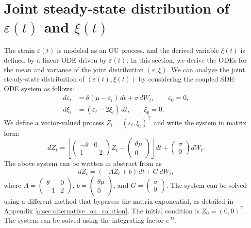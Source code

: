 \documentclass[11pt]{article}
\begin{document}
\section{Joint steady-state distribution of \texorpdfstring{$\varepsilon(t)$}{epsilon(t)} and \texorpdfstring{$\xi(t)$}{xi(t)}}

The strain $\varepsilon(t)$ is modeled as an OU process, and the derived variable $\xi(t)$ is defined by a linear ODE driven by $\varepsilon(t)$. In this section, we derive the ODEs for the mean and variance of the joint distribution $(\varepsilon, \xi)$. We can analyze the joint steady-state distribution of $(\varepsilon(t),\xi(t))$ by considering the coupled SDE--ODE system as follows:
\begin{align}
    d\varepsilon_t & = \theta(\mu-\varepsilon_t)\,dt+\sigma\,dW_t, \qquad \varepsilon_0 = 0, \\
    d\xi_t         & = (\varepsilon_t-2\xi_t)\,dt, \qquad \xi_0=0.
\end{align}
We define a vector-valued process $Z_t=(\varepsilon_t,\xi_t)^\top$ and write the system in matrix form:
\begin{equation}
    dZ_t=
    \left[
        \begin{pmatrix}
            -\theta & 0  \\
            1       & -2
        \end{pmatrix}Z_t+
        \begin{pmatrix}
            \theta\mu \\
            0
        \end{pmatrix}
        \right]dt+
    \begin{pmatrix}
        \sigma \\
        0
    \end{pmatrix}dW_t.
\end{equation}
The above system can be written in abstract from as
\begin{equation}
    dZ_t=(-AZ_t+b)\,dt+G\,dW_t,
\end{equation}
where $A = \begin{pmatrix}\theta & 0 \\ -1 & 2\end{pmatrix}$, $b=\begin{pmatrix}\theta\mu \\ 0\end{pmatrix}$, and $G=\begin{pmatrix}\sigma \\ 0\end{pmatrix}$. The system can be solved using a different method that bypasses the matrix exponential, as detailed in Appendix \ref{a:sec:alternative_ou_solution}. The initial condition is $Z_0=(0,0)^\top$. The system can be solved using the integrating factor $e^{At}$,
\end{document}
